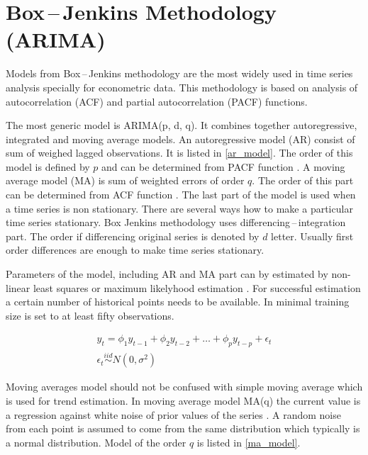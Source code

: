     \section{Box\,--\,Jenkins Methodology (ARIMA)}
    Models from Box\,--\,Jenkins methodology are the most widely used in time series
    analysis specially for econometric data. This methodology is based on analysis of autocorrelation (ACF)
    and partial autocorrelation (PACF) functions.
    
    The most generic model is ARIMA(p, d, q). It combines together autoregressive, integrated and
    moving average models. An autoregressive model (AR) consist of sum of weighed lagged observations. It is listed
    in \ref{ar_model}. The order of this model is defined by $p$ and can be determined from PACF function \cite{cipra}.
    A moving average model (MA) is sum of weighted errors of order $q$. The order of this part can be
    determined from ACF function \cite{cipra}. The last part of the model is used when a time series is non stationary.
    There are several ways how to make a  particular time series stationary. Box Jenkins methodology uses
    differencing\,--\,integration part. The order if differencing original series is denoted by $d$ letter. Usually
    first order differences are enough to make time series stationary.

    Parameters of the model, including AR and MA part can by estimated by non-linear
    least squares or maximum likelyhood estimation \cite{brockwell}. For successful estimation a certain number of
    historical points needs to be available. In \cite{cipra} minimal training size is set to at least fifty
    observations.

    \begin{eqnarray} \label{ar_model}
        y_t = \phi_1 y_{t-1} + \phi_2 y_{t-2} + \dots + \phi_p y_{t-p} + \epsilon_t \\ \nonumber
        \epsilon_t \overset{iid}{\sim} N(0, \sigma^2)
    \end{eqnarray}

    Moving averages model should not be confused with simple moving average which is
    used for trend estimation. In moving average model MA(q) the current value is
    a regression against white noise of prior values of the series \cite{wiki-ma-model}. A random noise from
    each point is assumed to come from the same distribution which typically is 
    a normal distribution. Model of the order $q$ is listed in \ref{ma_model}.

